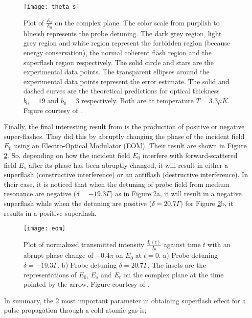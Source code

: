 \begin{figure}[h!]
    \centering
    \texttt{[image: theta\_s]}
    \caption{Plot of $\frac{E_{s}}{E_{0}}$ on the complex plane. The color scale from purplish to blueish represents the probe detuning. The dark grey region, light grey region and white region represent the forbidden region (because energy conservation), the normal coherent flash region and the superflash region respectively. The solid circle and stars are the experimental data points. The transparent ellipses around the experimental data points represent the error estimate. The solid and dashed curves are the theoretical predictions for optical thickness $b_{0} = 19$ and $b_{0} = 3$ respectively. Both are at temperature $T = 3.3\mu K$. Figure courtesy of \cite{Kwong2014}.}
    \label{fig: theta_s}
\end{figure}

Finally,  the final interesting result from \cite{Kwong2014} is the production of positive or negative super-flashes. They did this by abruptly changing the phase of the incident field $E_{0}$ using an Electro-Optical Modulator (EOM). Their result are shown in Figure \ref{fig: eom}. So, depending on how the incident field $E_{0}$ interfere with forward-scattered field $E_{s}$ after its phase has been abruptly changed, it will result in either a superflash (constructive interference) or an antiflash (destructive interference). In their case, it is noticed that when the detuning of probe field from medium resonance are negative ($\delta = -19.3 \Gamma$) as in Figure \ref{fig: eom}a, it will result in a negative superflash while when the detuning are positive ($\delta = 20.7 \Gamma$) for Figure \ref{fig: eom}b, it results in a positive superflash.

\newpage

\begin{figure}[h!]
    \centering
    \texttt{[image: eom]}
    \caption{Plot of normalized transmitted intensity $\frac{I_{t}(t)}{I_{0}}$ against time $t$ with an abrupt phase change of $-0.4\pi$ on $E_{0}$ at $t = 0$. a) Probe detuning $\delta = -19.3\Gamma$. b) Probe detuning $\delta = 20.7\Gamma$. The insets are the representations of $E_{0}$, $E_{s}$ and $E_{t}$ on the complex plane at the time pointed by the arrow. Figure courtesy of \cite{Kwong2014}.}
    \label{fig: eom}
\end{figure}

In summary, the 2 most important parameter in obtaining superflash effect for a pulse propagation through a cold atomic gas is;

